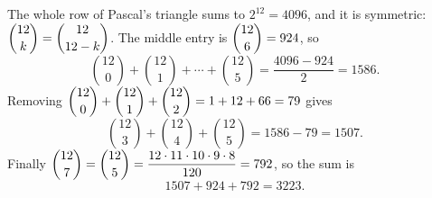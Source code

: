 The whole row of Pascal's triangle sums to $2^{12}=4096$, and it is symmetric: $\dbinom{12}{k}=\dbinom{12}{12-k}$. The middle entry is $\dbinom{12}{6}=924$, so
\[\binom{12}{0}+\binom{12}{1}+\cdots+\binom{12}{5}=\dfrac{4096-924}{2}=1586 .\]
Removing $\dbinom{12}{0}+\dbinom{12}{1}+\dbinom{12}{2}=1+12+66=79$ gives
\[\binom{12}{3}+\binom{12}{4}+\binom{12}{5}=1586-79=1507 .\]
Finally $\dbinom{12}{7}=\dbinom{12}{5}=\dfrac{12\cdot11\cdot10\cdot9\cdot8}{120}=792$, so the sum is
\[1507+924+792=\boxed{3223}.\]
